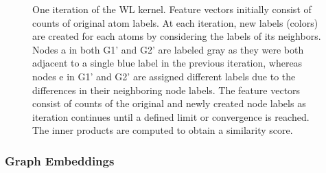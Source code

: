 \documentclass[
  super,
  preprint,
  3p]{elsarticle}
\begin{document}
\begin{figure}


\caption{\label{fig-wl}One iteration of the WL kernel. Feature vectors
initially consist of counts of original atom labels. At each iteration,
new labels (colors) are created for each atoms by considering the labels
of its neighbors. Nodes a in both G1' and G2' are labeled gray as they
were both adjacent to a single blue label in the previous iteration,
whereas nodes e in G1' and G2' are assigned different labels due to the
differences in their neighboring node labels. The feature vectors
consist of counts of the original and newly created node labels as
iteration continues until a defined limit or convergence is reached. The
inner products are computed to obtain a similarity score.}

\end{figure}%

\subsubsection{Graph Embeddings}\label{sec-graphembed}
\end{document}

